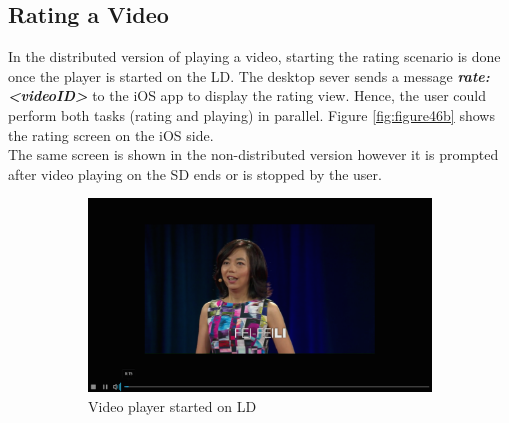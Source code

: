 \subsection{Rating a Video}
In the distributed version of playing a video, starting the rating scenario is done once the player is started on the LD. The desktop sever sends a message \textbf{\textit{rate:<videoID>}} to the iOS app to display the rating view. Hence, the user could perform both tasks (rating and playing) in parallel. Figure \ref{fig:figure46b} shows the rating screen on the iOS side.\\
The same screen is shown in the non-distributed version however it is prompted after video playing on the SD ends or is stopped by the user.
\begin{figure}
    \centering
    \begin{subfigure}[b]{0.6\textwidth}
        \includegraphics[width=\textwidth]{playerLD}
        \caption{Video player started on LD}
        \label{fig:figure46a}
    \end{subfigure}
    ~ %
    \begin{subfigure}[b]{0.3\textwidth}

\end{subfigure}
\end{figure}
